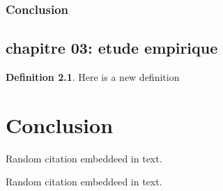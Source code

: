\documentclass[11pt,a4paper]{report}
\theoremstyle{definition}
\newtheorem{defn}{Definition}[section]
\begin{document}
		\section{Conclusion}


	\chapter{chapitre 03: etude empirique}
	
	\begin{defn}
			Here is a new definition
		\end{defn}
	

\part{Conclusion} 


Random citation \citep{seo2018effective} embeddeed in text.

Random citation \citep{brisaboa2009k} embeddeed in text.

\newpage


\end{document}
